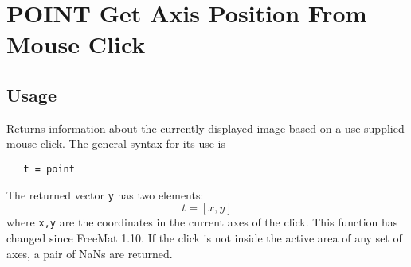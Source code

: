 \section{POINT Get Axis Position From Mouse Click}

\subsection{Usage}

Returns information about the currently displayed image based on a use
supplied mouse-click.  The general syntax for its use is
\begin{verbatim}
   t = point
\end{verbatim}
The returned vector \verb|y| has two elements: 
\[
  t = [x,y]
\]
where \verb|x,y| are the coordinates in the current axes of the click.  This 
function has changed since FreeMat 1.10.  If the click is not inside the
active area of any set of axes, a pair of NaNs are returned.
